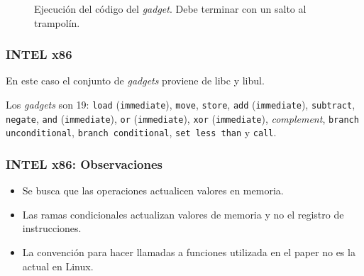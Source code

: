 \documentclass{beamer}
\newcommand { \vs } {\vspace{0.5cm}}
\begin{document}
\begin{frame}
{\begin{figure}[h]
            \caption{Ejecución del código del \textit{gadget}. Debe terminar con un salto al trampolín.}
        \end{figure}

    }
\end{frame}

\begin{frame}
    \frametitle{INTEL x86}
    En este caso el conjunto de \textit{gadgets} proviene de libc y libul. \\

    \vs

    Los \textit{gadgets} son 19: \texttt{load} (\texttt{immediate}), \texttt{move}, \texttt{store}, \texttt{add} (\texttt{immediate}), \texttt{subtract}, \texttt{negate}, \texttt{and} (\texttt{immediate}), \texttt{or} (\texttt{immediate}), \texttt{xor} (\texttt{immediate}), \textit{complement}, \texttt{branch unconditional}, \texttt{branch conditional}, \texttt{set less than} y \texttt{call}. 
\end{frame}

\begin{frame}
    \frametitle{INTEL x86: Observaciones}
    \begin{itemize}
        \item Se busca que las operaciones actualicen valores en memoria.
        \item Las ramas condicionales actualizan valores de memoria y no el registro de instrucciones.
        \item La convención para hacer llamadas a funciones utilizada en el paper no es la actual en Linux.
    \end{itemize}
\end{frame}
\end{document}
